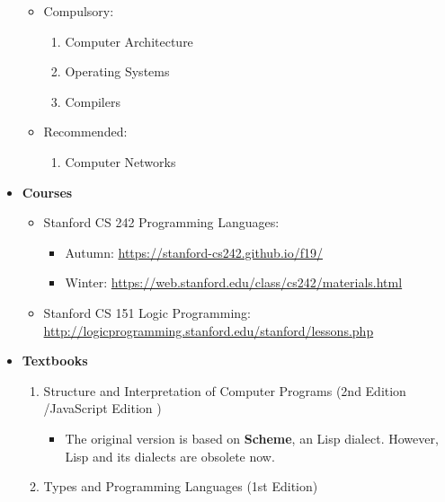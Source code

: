 \documentclass{article}
\begin{document}
\begin{itemize}
    \begin{itemize}
        \item Compulsory:
        \begin{enumerate}
            \item Computer Architecture
            \item Operating Systems
            \item Compilers
        \end{enumerate}
        \item Recommended:
        \begin{enumerate}
            \item Computer Networks
        \end{enumerate}
    \end{itemize}
    \item \textbf{Courses}
        \begin{itemize}
            \item Stanford CS 242 Programming Languages:
            \begin{itemize}
                \item Autumn:
                \href{https://stanford-cs242.github.io/f19/}{https://stanford-cs242.github.io/f19/}
                \item Winter:
                \href{https://web.stanford.edu/class/cs242/materials.html}{https://web.stanford.edu/class/cs242/materials.html}
            \end{itemize}
            \item Stanford CS 151 Logic Programming:\\
            \href{http://logicprogramming.stanford.edu/stanford/lessons.php}{http://logicprogramming.stanford.edu/stanford/lessons.php}
        \end{itemize}
    \item \textbf{Textbooks}
    \begin{enumerate}
        \item Structure and Interpretation of Computer Programs (2nd Edition \cite{abelson1996structure}/JavaScript Edition \cite{abelson2022structure})
        \begin{itemize}
            \item The original version is based on \textbf{Scheme}, an Lisp dialect.
            However, Lisp and its dialects are obsolete now.
        \end{itemize}
        \item Types and Programming Languages (1st Edition) \cite{pierce2002types}

\end{enumerate}
\end{itemize}
\end{document}
